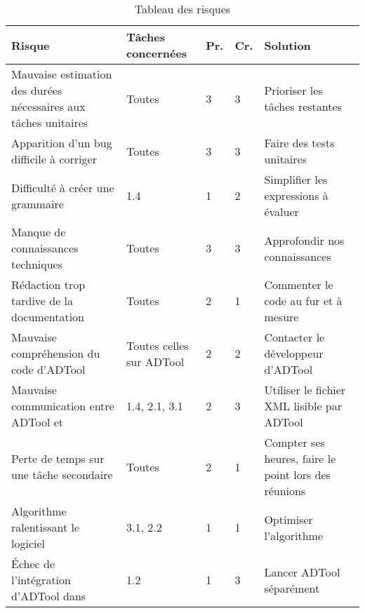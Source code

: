     \begin{table}[H]
        \centering
        \begin{tabular}{|p{4cm}|l|l|l|p{4cm}|}
        	\hline
            \textbf{Risque} & \textbf{Tâches concernées} & \textbf{Pr.} & \textbf{Cr.} & \textbf{Solution}\\
            \hline
            Mauvaise estimation des durées nécessaires aux tâches unitaires & 
                Toutes & 3 & 3 &
                Prioriser les tâches restantes\\ 
            \hline
            Apparition d'un bug difficile à corriger & 
                Toutes & 3 & 3 &
                Faire des tests unitaires\\
            \hline
            Difficulté à créer une grammaire & 
                1.4 & 1 & 2 &
                Simplifier les expressions à évaluer\\ 
            \hline
            Manque de connaissances techniques & 
                Toutes & 3 & 3 &
                Approfondir nos connaissances\\ 
            \hline
            Rédaction trop tardive de la documentation & 
                Toutes & 2 & 1 &
                Commenter le code au fur et à mesure\\
            \hline
            Mauvaise compréhension du code d'ADTool & 
                Toutes celles sur ADTool & 2 & 2 &
                Contacter le développeur d'ADTool\\ 
            \hline
            Mauvaise communication entre ADTool et \glasir{} & 
                1.4, 2.1, 3.1 & 2 & 3 &
                Utiliser le fichier XML lisible par ADTool\\ 
            \hline
            Perte de temps sur une tâche secondaire & 
                Toutes & 2 & 1 &
                Compter ses heures, faire le point lors des réunions\\ 
            \hline
            Algorithme ralentissant le logiciel & 
                3.1, 2.2 & 1 & 1 &
                Optimiser l’algorithme\\ 
            \hline
            Échec de l'intégration d'ADTool dans \glasir{} & 
                1.2 & 1 & 3 &
                Lancer ADTool séparément\\ 
            \hline
        \end{tabular}
        \caption{Tableau des risques}
        \label{fig:risques}
    \end{table}
